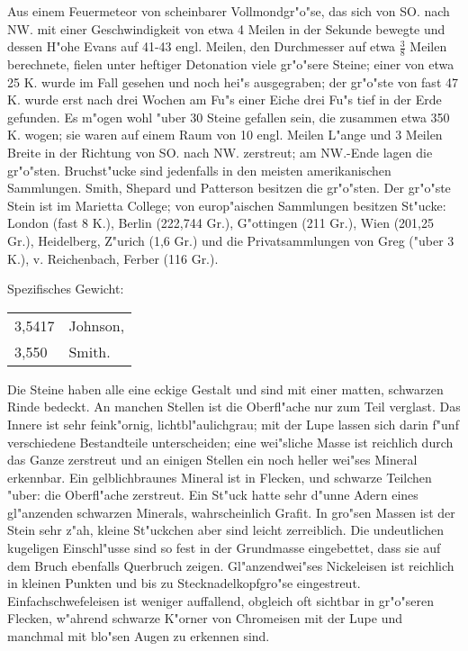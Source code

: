 \documentclass[a4paper, 11pt, oneside]{article}
\begin{document}
Aus einem Feuermeteor von scheinbarer Vollmondgr"o"se, das sich von SO. nach NW. mit einer Geschwindigkeit von etwa 4 Meilen in der Sekunde bewegte und dessen H"ohe Evans auf 41-43 engl. Meilen, den Durchmesser auf etwa $\mathfrak{\frac{3}{8}}$ Meilen berechnete, fielen unter heftiger Detonation viele gr"o"sere Steine; einer von etwa 25 K. wurde im Fall gesehen und noch hei"s ausgegraben; der gr"o"ste von fast 47 K. wurde erst nach drei Wochen am Fu"s einer Eiche drei Fu"s tief in der Erde gefunden. Es m"ogen wohl "uber 30 Steine gefallen sein, die zusammen etwa 350 K. wogen; sie waren auf einem Raum von 10 engl. Meilen L"ange und 3 Meilen Breite in der Richtung von SO. nach NW. zerstreut; am NW.-Ende lagen die gr"o"sten. Bruchst"ucke sind jedenfalls in den meisten amerikanischen Sammlungen. Smith, Shepard und Patterson besitzen die gr"o"sten. Der gr"o"ste Stein ist im Marietta College; von europ"aischen Sammlungen besitzen St"ucke: London (fast 8 K.), Berlin (222,744 Gr.), G"ottingen (211 Gr.), Wien (201,25 Gr.), Heidelberg, Z"urich (1,6 Gr.) und die Privatsammlungen von Greg ("uber 3 K.), v. Reichenbach, Ferber (116 Gr.).

Spezifisches Gewicht:  
\begin{table}[!ht]
    \centering\swabfamily\Large
    \begin{tabular}{l l}
        3,5417 & Johnson,\\
        3,550 & Smith.
    \end{tabular}
\end{table}

Die Steine haben alle eine eckige Gestalt und sind mit einer matten, schwarzen Rinde bedeckt. An manchen Stellen ist die Oberfl"ache nur zum Teil verglast. Das Innere ist sehr feink"ornig, lichtbl"aulichgrau; mit der Lupe lassen sich darin f"unf verschiedene Bestandteile unterscheiden; eine wei"sliche Masse ist reichlich durch das Ganze zerstreut und an einigen Stellen ein noch heller wei"ses Mineral erkennbar. Ein gelblichbraunes Mineral ist in Flecken, und schwarze Teilchen "uber: die Oberfl"ache zerstreut. Ein St"uck hatte sehr d"unne Adern eines gl"anzenden schwarzen Minerals, wahrscheinlich Grafit. In gro"sen Massen ist der Stein sehr z"ah, kleine St"uckchen aber sind leicht zerreiblich. Die undeutlichen kugeligen Einschl"usse sind so fest in der Grundmasse eingebettet, dass sie auf dem Bruch ebenfalls Querbruch zeigen. Gl"anzendwei"ses Nickeleisen ist reichlich in kleinen Punkten und bis zu Stecknadelkopfgro"se eingestreut. Einfachschwefeleisen ist weniger auffallend, obgleich oft sichtbar in gr"o"seren Flecken, w"ahrend schwarze K"orner von Chromeisen mit der Lupe und manchmal mit blo"sen Augen zu erkennen sind.
\end{document}
